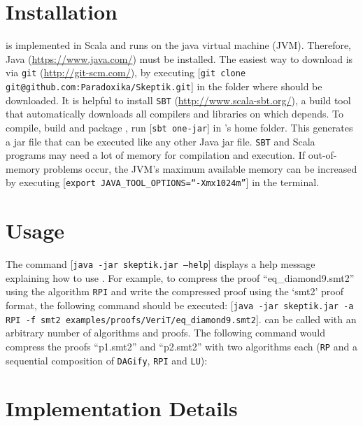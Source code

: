 \documentclass{llncs}
\begin{document}
\newcommand{\com}[1]{[\texttt{#1}]}

\section{Installation}

{\skeptik} is implemented in Scala and runs on the java virtual machine (JVM). Therefore, Java (\url{https://www.java.com/}) must be installed. The easiest way to download {\skeptik} is via \texttt{git} (\url{http://git-scm.com/}), by executing \com{git clone git@github.com:Paradoxika/Skeptik.git} in the folder where {\skeptik} should be downloaded. It is helpful to install \texttt{SBT} (\url{http://www.scala-sbt.org/}), a build tool that automatically downloads all compilers and libraries on which {\skeptik} depends. To compile, build and package {\skeptik}, run \com{sbt one-jar} in {\skeptik}'s home folder. This generates a jar file that can be executed like any other Java jar file.
%
\texttt{SBT} and Scala programs may need a lot of memory for compilation and execution. If out-of-memory problems occur, the JVM's maximum available memory can be increased by executing \com{export JAVA\_TOOL\_OPTIONS=``-Xmx1024m''} in the terminal.


\section{Usage}

The command \com{java -jar skeptik.jar --help} displays a help message explaining how to use {\skeptik}. For example, to compress the proof ``eq\_diamond9.smt2'' using the algorithm \texttt{RPI} and write the compressed proof using the `smt2' proof format, the following command should be executed: \com{java -jar skeptik.jar -a RPI -f smt2 examples/proofs/VeriT/eq\_diamond9.smt2}. {\skeptik} can be called with an arbitrary number of algorithms and proofs. The following command would compress the proofs ``p1.smt2'' and ``p2.smt2'' with two algorithms each (\texttt{RP} and a sequential composition of \texttt{DAGify}, \texttt{RPI} and \texttt{LU}): \\
\com{java -jar skeptik.jar -a RP -a (DAGify*RPI*LU) p1.smt2 p2.smt2} 


\newcommand{\class}[1]{\texttt{#1}}


\section{Implementation Details}
\end{document}
